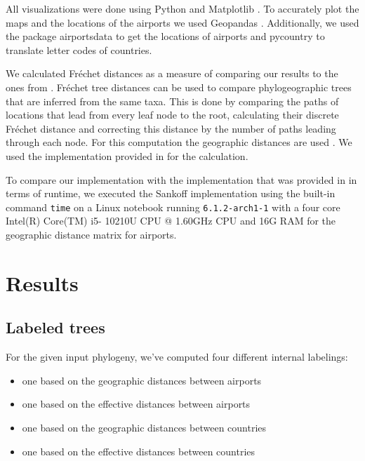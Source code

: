 \documentclass{article}
\begin{document}
All visualizations were done using Python and Matplotlib \cite{MatplotlibVisualizationPython}. To accurately plot the maps and the locations of the
airports we used Geopandas \cite{GeoPandas12GeoPandas}. Additionally, we used the package airportsdata \cite{borsettiAirportsdataExtensiveDatabase2022} to get the locations of
airports and pycountry \cite{theunePycountryISOCountry} to translate letter codes
of countries.

We calculated Fr\'{e}chet distances as a measure of comparing our results to the ones from \cite{reimeringPhylogeographicReconstructionUsing2020}. Fr\'{e}chet tree distances can be used to compare phylogeographic trees that are inferred from the same taxa. This is done by comparing the paths of locations that lead from every leaf node to the root, calculating their discrete Fr\'{e}chet distance and correcting this distance by the number of paths leading through each node. For this computation the geographic distances are used \cite{reimeringFrechetTreeDistance2018}. We used the implementation provided in \cite{reimeringFrechetTreeDistance2018} for the calculation.

To compare our implementation with the implementation that
was provided in \cite{reimeringPhylogeographicReconstructionUsing2020} in terms of runtime, we
executed the Sankoff implementation using the built-in command \texttt{time} on
a Linux notebook running \texttt{6.1.2-arch1-1} with a four core Intel(R) Core(TM) i5-
10210U CPU @ 1.60GHz CPU and 16G RAM for the geographic distance matrix for airports.

\section{Results}

\subsection{Labeled trees}
For the given input phylogeny, we've computed four different internal labelings: 
\begin{itemize}
    \item one based on the geographic distances between airports
    \item one based on the effective distances between airports
    \item one based on the geographic distances between countries
    \item one based on the effective distances between countries
\end{itemize}
\end{document}

